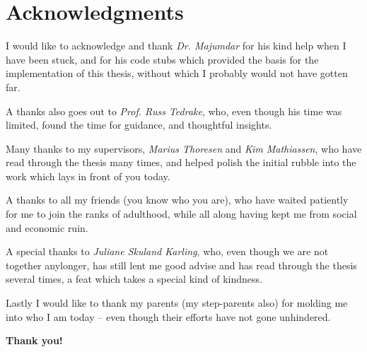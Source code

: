 \chapter{Acknowledgments}

\noindent \textsf{I} would like to acknowledge and thank \textit{Dr.
  Majumdar} for his kind help when I have been stuck, and for his code stubs
which provided the basis for the implementation of this thesis, without which I
probably would not have gotten far.

\vspace{1em}

\noindent \textsf{A} thanks also goes out to \textit{Prof. Russ
  Tedrake}, who, even though his time was limited, found the time for guidance,
and thoughtful insights.

\vspace{1em}

\noindent \textsf{M}any thanks to my supervisors, \textit{Marius
  Thoresen} and \textit{Kim Mathiassen}, who have read through the thesis many
times, and helped polish the initial rubble into the work which lays in front of
you today.

\vspace{1em}

\noindent \textsf{A} thanks to all my friends (you know who you are),
who have waited patiently for me to join the ranks of adulthood, while all along
having kept me from social and economic ruin.

\vspace{1em}

\noindent \textsf{A} special thanks to \textit{Juliane Skuland
  Karling}, who, even though we are not together anylonger, has still lent me
good advise and has read through the thesis several times, a feat which takes a
special kind of kindness.

\vspace{1em}

\noindent \textsf{L}astly I would like to thank my parents (my
step-parents also) for molding me into who I am today -- even though their
efforts have not gone unhindered.

\vspace{1em}

{
  \centering \textsf{\textbf{Thank you!}}\par
}
